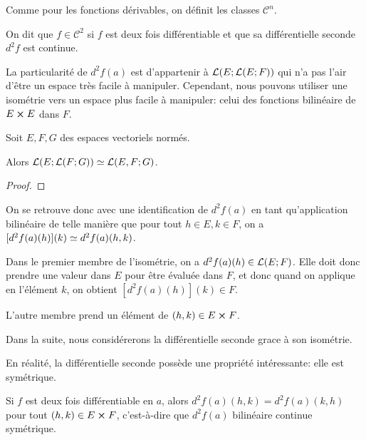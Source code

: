 Comme pour les fonctions dérivables, on définit les classes $\mathcal{C}^{n}$.

\begin{definition}
	On dit que $f \in \mathcal{C}^{2}$ si $f$ est deux fois différentiable et
	que sa différentielle seconde $d^{2}f$ est continue.
\end{definition}

La particularité de $d^{2}f(a)$ est d'appartenir à
$\mathcal{L}(E; \mathcal{L}(E; F))$ qui n'a pas l'air d'être un espace
très facile à manipuler. Cependant, nous pouvons utiliser une isométrie vers un
espace plus facile à manipuler: celui des fonctions bilinéaire de $E \cross
E$ dans $F$.

\begin{proposition}
	Soit $E, F, G$ des espaces vectoriels normés.

	Alors $\mathcal{L}(E; \mathcal{L}(F; G)) \simeq
	\mathcal{L}(E,F; G)$.
\end{proposition}

\ifdefined\outputproof
\begin{proof}

\end{proof}
\fi

On se retrouve donc avec une identification de $d^{2}f(a)$ en tant
qu'application bilinéaire de telle manière que pour tout $h \in E, k \in F$, on
a $[d^{2}f(a)(h)](k) \simeq d^{2}f(a)(h, k)$.

Dans le premier membre de l'isométrie, on a $d^{2}f(a)(h) \in
\mathcal{L}(E; F)$. Elle doit donc prendre une valeur dans $E$ pour être
évaluée dans $F$, et donc quand on applique en l'élément $k$, on obtient
$[d^{2}f(a)(h)](k) \in F$.

L'autre membre prend un élément de $(h, k) \in E \cross F$.

Dans la suite, nous considérerons la différentielle seconde grace à son
isométrie.

En réalité, la différentielle seconde possède une propriété intéressante: elle
est symétrique.

\begin{theorem}
	\label{theorem_schwarz}

	Si $f$ est deux fois différentiable en $a$, alors $d^{2}f(a)(h, k) =
	d^{2}f(a)(k, h)$ pour tout $(h, k) \in E \cross F$, c'est-à-dire que
	$d^{2}f(a)$ bilinéaire continue symétrique.
\end{theorem}

